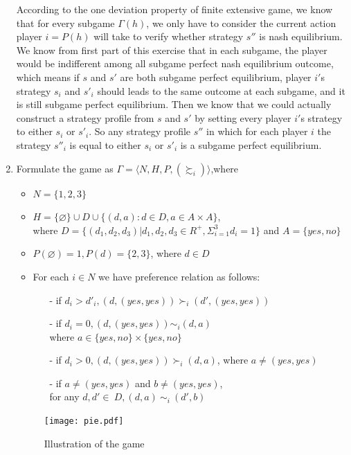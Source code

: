 \documentclass[a4paper,12pt]{article}
\begin{document}
\begin{enumerate}
According to the one deviation property of finite extensive game, 
we know that for every subgame $\Gamma(h)$, 
we only have to consider the current action player $i=P(h)$ will take to verify whether strategy $s''$ is nash equilibrium.
We know from first part of this exercise that in each subgame, 
the player would be indifferent among all subgame perfect nash equilibrium outcome, which means if $s$ and $s'$
are both subgame perfect equilibrium, player $i'$s strategy $s_i$ and $s'_i$ should leads to the same outcome at each subgame,
and it is still subgame perfect equilibrium.
Then we know that we could actually construct a strategy profile from $s$ and $s'$ by setting every player $i'$s strategy to 
either $s_i$ or $s'_i$. 
So any strategy profile $s''$ in which for each player $i$ the strategy $s''_i$ 
is equal to either $s_i$ or $s'_i$ is a subgame perfect equilibrium.


\item
Formulate the game as $\Gamma=\langle N,H,P,(\succsim_i)\rangle$,where
\begin{itemize}
\item $N=\{1,2,3\}$
\item $H=\{\varnothing\} \cup D \cup \{(d,a):d \in D,a \in A \times A\}$, \\
where $D=\{(d_1,d_2,d_3)|d_1,d_2,d_3 \in R^+, \Sigma_{i=1}^3 d_i=1\}$ and
$A=\{yes,no\}$
\item $P(\varnothing)=1, P(d)=\{2,3\}$, where $d \in D$
\item
For each $i \in N$ we have preference relation as follows:
\begin{itemize}
\item[-]
if $d_i > d'_i, (d,(yes,yes))\succ_i(d',(yes,yes))$
\item[-]
if $d_i=0, (d,(yes,yes))\sim_i (d,a)$\\where $a \in \{yes,no\} \times \{yes,no\}$
\item[-]
if $d_i>0, (d,(yes,yes))\succ_i(d,a)$, where $a\neq (yes,yes)$
\item[-]
if $a\neq (yes,yes)$ and $b\neq (yes,yes)$,\\for any $d,d'\in~D, (d,a)~\sim_i~(d',b)$
\end{itemize}
\end{itemize}

\begin{figure}[!ht]
\centering
\texttt{[image: pie.pdf]}
\caption{Illustration of the game}
\label{fig:pie}
\end{figure}


\end{enumerate}
\end{document}
